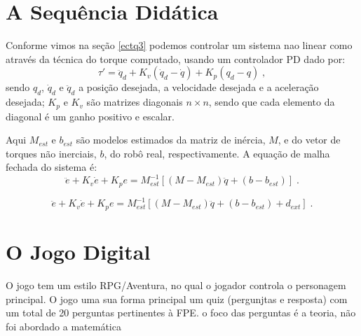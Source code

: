 \section{A Sequência Didática}


Conforme vimos na seção \ref{ectq3} podemos controlar um sistema nao linear como  através da técnica do torque computado, usando um controlador PD dado por:
\begin{equation} \label{ectq3}
\tau'=\ddot{q}_d+K_v(\dot{q}_d-\dot{q})+K_p(q_d-q) \; ,
\end{equation}
sendo $q_{d}$, $\dot{q}_{d}$ e $\ddot{q}_{d}$ a posição desejada, a velocidade desejada e a aceleração desejada; $K_p$
e $K_v$ são matrizes diagonais $n \times n$, sendo que cada elemento da diagonal é um ganho positivo e escalar.

Aqui $M_{est}$ e $b_{est}$ são modelos estimados da matriz de inércia, $M$, e do vetor de torques não inerciais, $b$, do robô real,  respectivamente. A equação de malha fechada do sistema é:
\begin{equation} \label{ectq4}
\ddot{e}+K_v\dot{e}+K_pe=M_{est}^{-1}[(M-M_{est})\ddot{q}+(b-b_{est})] \; .
\end{equation}

\begin{equation} \label{ectq5}
\ddot{e}+K_v\dot{e}+K_pe=M_{est}^{-1}[(M-M_{est})\ddot{q}+(b-b_{est})+d_{ext}] \; .
\end{equation}
\section{O Jogo Digital}

O jogo tem um estilo RPG/Aventura, no qual o jogador controla o personagem principal. 
O jogo uma sua forma principal um quiz (pergunjtas e resposta) com um total de 20 perguntas pertinentes à FPE. o foco das perguntas é a teoria, não foi abordado a matemática
